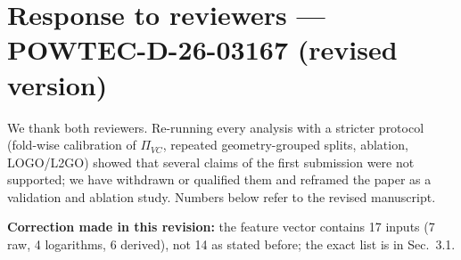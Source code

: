 \documentclass[11pt]{article}\usepackage[margin=2.3cm]{geometry}\usepackage{enumitem}\setlength{\parindent}{0pt}\setlength{\parskip}{4pt}
\begin{document}
\section*{Response to reviewers --- POWTEC-D-26-03167 (revised version)}
We thank both reviewers. Re-running every analysis with a stricter protocol (fold-wise calibration of $\Pi_{VC}$, repeated geometry-grouped splits, ablation, LOGO/L2GO) showed that several claims of the first submission were not supported; we have withdrawn or qualified them and reframed the paper as a validation and ablation study. Numbers below refer to the revised manuscript.

\textbf{Correction made in this revision:} the feature vector contains 17 inputs (7 raw, 4 logarithms, 6 derived), not 14 as stated before; the exact list is in Sec.~3.1.
\end{document}
